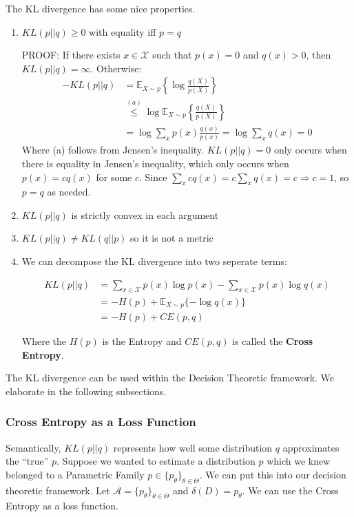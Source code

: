 \documentclass[]{article}
\theoremstyle{mattstyle}
\theoremstyle{definition}
\begin{document}
The KL divergence has some nice properties.
\begin{enumerate}
	\item $KL(p||q) \ge 0$ with equality iff $p=q$
	
	PROOF: If there exists $x \in \mathcal{X}$ such that $p(x) = 0$ and $q(x) > 0$, then $KL(p || q) = \infty$.	Otherwise:
	\begin{align*}
	-KL(p||q) &= \mathbb{E}_{X\sim p}\left\{\log \frac{q(X)}{p(X)}\right\}\\
	&\overset{(a)}{\le} \log \mathbb{E}_{X\sim p}\left\{\frac{q(X)}{p(X)}\right\} \\
	&= \log \sum_{x} p(x)\frac{q(x)}{p(x)} = \log \sum_{x} q(x) = 0
	\end{align*}
	Where (a) follows from Jensen's inequality. $KL(p||q) = 0$ only occurs when there is equality in Jensen's inequality, which only occurs when $p(x)=cq(x)$ for some $c$. Since $\sum_{x}cq(x) = c\sum_{x}q(x) = c \Rightarrow c=1$, so $p=q$ as needed.
	
	\item $KL(p||q)$ is strictly convex in each argument
	
	\item $KL(p||q) \ne KL(q||p)$ so it is not a metric
	
	\item We can decompose the KL divergence into two seperate terms:
	
	\begin{align} KL(p||q) &= \sum_{x\in\mathcal{X}}p(x)\log p(x) - \sum_{x\in\mathcal{X}}p(x)\log q(x) \\
	&= -H(p) + \mathbb{E}_{X\sim p}\{-\log q(x)\} \\
	&= -H(p) + CE(p,q)
	\end{align}
	
	Where the $H(p)$ is the Entropy and $CE(p,q)$ is called the \textbf{Cross Entropy}.
	
\end{enumerate}

The KL divergence can be used within the Decision Theoretic framework. We elaborate in the following subsections.

\subsubsection{Cross Entropy as a Loss Function}

Semantically, $KL(p||q)$ represents how well some distribution $q$ approximates the ``true'' $p$. Suppose we wanted to estimate a distribution $p$ which we knew belonged to a Parametric Family  $p\in \{p_{\theta}\}_{\theta\in\Theta}$. We can put this into our decision theoretic framework. Let \(\mathcal{A} = \{p_{\theta}\}_{\theta\in\Theta}\) and $\delta(D)=p_{\theta}$. We can use the Cross Entropy as a loss function.
\end{document}
